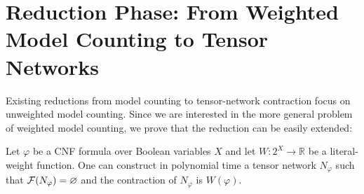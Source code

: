 \section{Reduction Phase: From Weighted Model Counting to Tensor Networks}
\label{sec:tensors:wmc}
Existing reductions from model counting to tensor-network contraction \cite{BMT15,KCMR18} focus on unweighted model counting. Since we are interested in the more general problem of weighted model counting, we prove that the reduction can be easily extended:
\begin{theorem}
\label{thm:wmc-reduction}
Let $\varphi$ be a CNF formula over Boolean variables $X$ and let $W: 2^X \rightarrow \mathbb{R}$ be a literal-weight function. One can construct in polynomial time a tensor network $N_\varphi$ such that $\mathcal{F}(N_\varphi) = \varnothing$ and the contraction of $N_\varphi$ is $W(\varphi)$.
\end{theorem}
